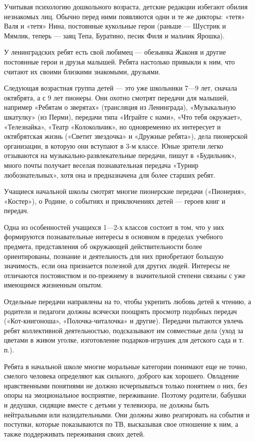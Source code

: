 \documentclass[12pt, a4paper, openany]{book}
\begin{document}
Учитывая психологию дошкольного возраста, детские редакции избегают обилия незнакомых лиц. Обычно перед ними появляются одни и те же дикторы: «тетя» Валя и «тетя» Нина, постоянные кукольные герои (раньше — Шустрик и Мямлик, теперь — заяц Тепа, Буратино, песик Филя и мальчик Ярошка). 

У ленинградских ребят есть свой любимец — обезьянка Жаконя и другие постоянные герои и друзья малышей. Ребята настолько привыкли к ним, что считают их своими близкими знакомыми, друзьями. 

Следующая возрастная группа детей — это уже школьники 7—9 лет, сначала октябрята, а с 9 лет пионеры. Они охотно смотрят передачи для малышей, например «Ребятам о зверятах» (трансляция из Ленинграда), «Музыкальную шкатулку» (из Перми), передачи типа «Играйте с нами», «Что тебя окружает», «Телезнайка», «Театр «Колокольчик», но одновременно их интересует и октябрятская жизнь («Светит звездочка» и «Дружные ребята»), дела пионерской организации, в которую они вступают в 3-м классе. Юные зрители легко отзываются на музыкально-развлекательные передачи, пишут в «Будильник», много почты получает веселая познавательная передача «Турнир любознательных», хотя она и предназначена для более старших ребят. 

Учащиеся начальной школы смотрят многие пионерские передачи («Пионерия», «Костер»), о Родине, о событиях и приключениях детей — героев книг и передач. 

Одна из особенностей учащихся 1—2-х классов состоит в том, что у них формируются познавательные интересы в основном в пределах учебного предмета, представления об окружающей действительности более ориентированы, познание и деятельность для них приобретают большую значимость, если она признается полезной для других людей. Интересы не отличаются постоянством и по-прежнему в значительной степени связаны с уже имеющимся жизненным опытом. 

Отдельные передачи направлены на то, чтобы укрепить любовь детей к чтению, а родители и педагоги должны всячески поощрять просмотр подобных передач («Кот-книгоноша», «Полочка-читалочка» и другие). Передачи пытаются увлечь ребят коллективной деятельностью, подсказывают им совместные дела (уход за цветами в живом уголке, изготовление подарков-игрушек для детского сада и т. п.). 

Ребята в начальной школе многие моральные категории понимают еще не точно, смелого человека определяют как сильного, доброго как хорошего. Овладение нравственными понятиями не должно исчерпываться только понятием о них, без опоры на эмоциональное восприятие, переживание. Поэтому родители, бабушки и дедушки, сидящие вместе с детьми у телевизора, не должны быть нейтральными или назидательными. Они должны живо реагировать на события и поступки, которые показываются по ТВ, высказывая свое отношение к ним, а также поддерживать переживания своих детей. 
\end{document}

